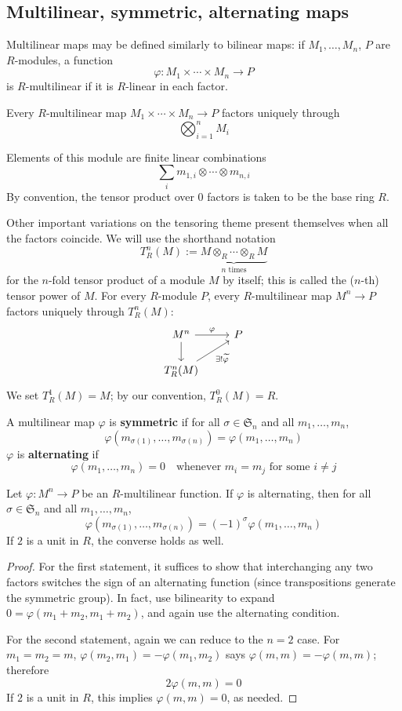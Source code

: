 \subsection{Multilinear, symmetric, alternating maps}
Multilinear maps may be defined similarly to bilinear maps: if $M_1,\dots,M_n$, $P$ are $R$-modules, a function
\[\varphi:M_1\times\cdots\times M_n\to P\]
is $R$-multilinear if it is $R$-linear in each factor.
\begin{claim}
Every $R$-multilinear map $M_1\times\cdots\times M_n\to P$ factors uniquely through
\[\bigotimes_{i=1}^{n}M_i\]
\end{claim}
Elements of this module are finite linear combinations
\[\sum_im_{1,i}\otimes\cdots\otimes m_{n,i}\]
By convention, the tensor product over $0$ factors is taken to be the base ring $R$.\par
Other important variations on the tensoring theme present themselves when all the factors coincide. We will use the shorthand notation
\[T_R^{n}(M):=\underbrace{M\otimes_{R}\cdots\otimes_{R}M}_{\text{$n$ times}}\]
for the $n$-fold tensor product of a module $M$ by itself; this is called the ($n$-th) tensor
power of $M$. For every $R$-module $P$, every $R$-multilinear map $M^{n}\to P$ factors uniquely through $T_R^{n}(M)$:
\[\begin{tikzcd}
M^n\ar[d]\ar[r,"\varphi"]&P\\
T_R^{n}(M)\ar[ru,swap,"\exists !\widetilde{\varphi}"]
\end{tikzcd}\]
We set $T_R^{1}(M)=M$; by our convention, $T_R^{0}(M)=R$.
\begin{definition}
A multilinear map $\varphi$ is \textbf{symmetric} if for all $\sigma\in\mathfrak{S}_{n}$ and all $m_1,\dots,m_n$, 
\[\varphi(m_{\sigma(1)},\dots,m_{\sigma(n)})=\varphi(m_1,\dots,m_n)\]
$\varphi$ is \textbf{alternating} if
\[\varphi(m_1,\dots,m_n)=0\quad\text{whenever $m_i=m_j$ for some $i\neq j$}\]
\end{definition}
\begin{lemma}
Let $\varphi:M^n\to P$ be an $R$-multilinear function. If $\varphi$ is alternating, then for all $\sigma\in\mathfrak{S}_n$ and all $m_1,\dots,m_n$,
\[\varphi(m_{\sigma(1)},\dots,m_{\sigma(n)})=(-1)^\sigma\varphi(m_1,\dots,m_n)\]
If $2$ is a unit in $R$, the converse holds as well.
\end{lemma}
\begin{proof}
For the first statement, it suffices to show that interchanging any two factors switches the sign of an alternating function (since transpositions generate the symmetric group). In fact, use bilinearity to expand $0=\varphi(m_1+m_2,m_1+m_2)$, and again use the alternating condition.\par
For the second statement, again we can reduce to the $n=2$ case. For $m_1=m_2=m$, $\varphi(m_2,m_1)=-\varphi(m_1,m_2)$ says $\varphi(m,m)=-\varphi(m,m)$; therefore
\[2\varphi(m,m)=0\]
If $2$ is a unit in $R$, this implies $\varphi(m,m)=0$, as needed.
\end{proof}
